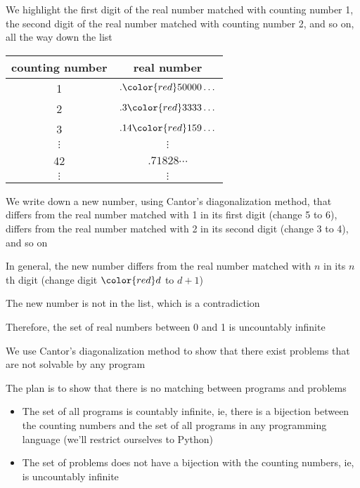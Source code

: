 \documentclass[8pt,a4paper,compress]{beamer}
\begin{document}
\begin{frame}[fragile]
\pause

We highlight the first digit of the real number matched with counting number 1, the second digit of the real number matched with counting number 2, and so on, all the way down the list
\begin{center}
\begin{tabular}{c|c}
counting number & real number \\ \hline
1 & $.{\color{red} 5}0000\dots$ \\ 
2 & $.3{\color{red}3}333\dots$ \\
3 & $.14{\color{red}1}59\dots$ \\ 
$\vdots$ & $\vdots$ \\
42 & $.71828\cdots$ \\
$\vdots$ & $\vdots$
\end{tabular}
\end{center}

\pause
\bigskip

We write down a new number, using Cantor's diagonalization method, that differs from the real number matched with 1 in its first digit (change {\color{red} 5} to 6), differs from the real number matched with 2 in its second digit (change {\color{red} 3} to 4), and so on

\pause
\bigskip

In general, the new number differs from the real number matched with $n$ in its $n$th digit (change digit ${\color{red} d}$ to $d+1$)

\pause
\bigskip

The new number is not in the list, which is a contradiction

\pause
\bigskip

Therefore, the set of real numbers between 0 and 1 is uncountably infinite
\end{frame}

\begin{frame}[fragile]
\pause

We use Cantor's diagonalization method to show that there exist problems that are not solvable by any program

\pause
\bigskip

The plan is to show that there is no matching between programs and problems
\begin{itemize}
\item The set of all programs is countably infinite, ie, there is a bijection between the counting numbers and the set of all programs in any programming language (we'll restrict ourselves to Python)

\item The set of problems does not have a bijection with the counting numbers, ie, is uncountably infinite
\end{itemize}
\end{frame}
\end{document}
